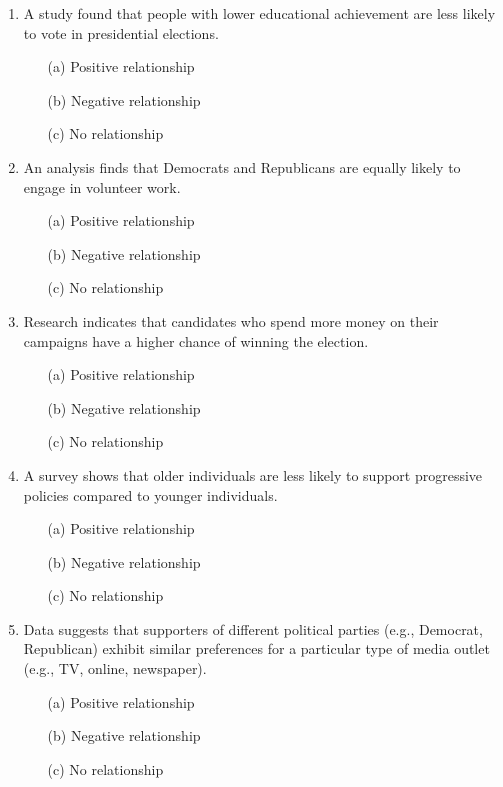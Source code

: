 \documentclass{article}
\begin{document}
\begin{enumerate}
    \item A study found that people with lower educational achievement are less likely to vote in presidential elections.
    \begin{itemize}
        \item[(a)] Positive relationship
        \item[(b)] Negative relationship
        \item[(c)] No relationship
    \end{itemize}

    \item An analysis finds that Democrats and Republicans are equally likely to engage in volunteer work.
    \begin{itemize}
        \item[(a)] Positive relationship
        \item[(b)] Negative relationship
        \item[(c)] No relationship
    \end{itemize}

    \item Research indicates that candidates who spend more money on their campaigns have a higher chance of winning the election.
    \begin{itemize}
        \item[(a)] Positive relationship
        \item[(b)] Negative relationship
        \item[(c)] No relationship
    \end{itemize}

    \item A survey shows that older individuals are less likely to support progressive policies compared to younger individuals.
    \begin{itemize}
        \item[(a)] Positive relationship
        \item[(b)] Negative relationship
        \item[(c)] No relationship
    \end{itemize}

    \item Data suggests that supporters of different political parties (e.g., Democrat, Republican) exhibit similar preferences for a particular type of media outlet (e.g., TV, online, newspaper).
    \begin{itemize}
        \item[(a)] Positive relationship
        \item[(b)] Negative relationship
        \item[(c)] No relationship
    \end{itemize}

\end{enumerate}
\end{document}
